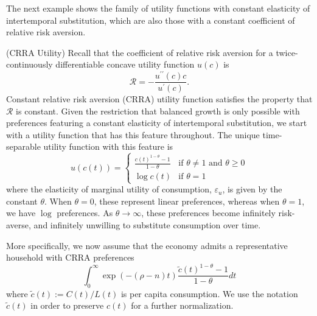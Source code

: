 \documentclass[\topdir/lecture\_notes.tex]{subfiles}
\begin{document}
The next example shows the family of utility functions with constant elasticity of intertemporal substitution, which are also those with a constant coefficient of relative risk aversion.

\begin{example} (CRRA Utility)\label{ex:crra}
  Recall that the coefficient of relative risk aversion for a twice-continuously differentiable concave utility function \(u(c)\) is
  \[
    \mathcal{R}=-\frac{u^{\prime \prime}(c) c}{u^{\prime}(c)}.
  \]
  Constant relative risk aversion (CRRA) utility function satisfies the property that \(\mathcal{R}\) is constant. Given the restriction that balanced growth is only possible with preferences featuring a constant elasticity of intertemporal substitution, we start with a utility function that has this feature throughout. The unique time-separable utility function with this feature is
  \begin{equation}
    u(c(t)) = \begin{cases}
      \frac{c(t)^{1-\theta}-1}{1-\theta} & \text{if } \theta \neq 1 \text{ and } \theta \geq 0 \\
      \log c(t)                          & \text{if } \theta = 1
    \end{cases}
    \label{eq:crra-utility}
  \end{equation}
  where the elasticity of marginal utility of consumption, \(\varepsilon_{u}\), is given by the constant \(\theta\). When \(\theta=0\), these represent linear preferences, whereas when \(\theta=1\), we have \(\log\) preferences. As \(\theta \rightarrow \infty\), these preferences become infinitely risk-averse, and infinitely unwilling to substitute consumption over time.
\end{example}

More specifically, we now assume that the economy admits a representative household with CRRA preferences
\[
  \int_{0}^{\infty} \exp(-(\rho-n) t) \frac{\tilde{c}(t)^{1-\theta}-1}{1-\theta} dt
\]
where \(\tilde{c}(t) := C(t) / L(t)\) is per capita consumption. We use the notation \(\tilde{c}(t)\) in order to preserve \(c(t)\) for a further normalization.
\end{document}
